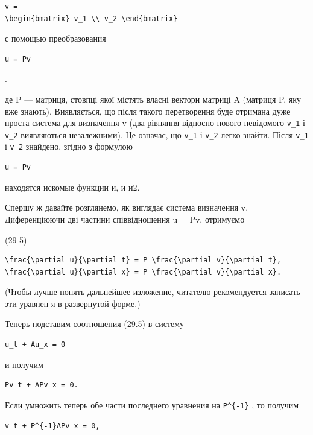 \documentclass[
  ukrainian,
]{article}
\begin{document}
\begin{verbatim}
v =
\begin{bmatrix} v_1 \\ v_2 \end{bmatrix}
\end{verbatim}

с помощью преобразования

\begin{verbatim}
u = Pv
\end{verbatim}

.

де P --- матриця, стовпці якої містять власні вектори матриці A (матриця
P, яку вже знають). Виявляється, що після такого перетворення буде
отримана дуже проста система для визначення v (два рівняння відносно
нового невідомого \texttt{v\_1} і \texttt{v\_2} виявляються
незалежними). Це означає, що \texttt{v\_1} і \texttt{v\_2} легко знайти.
Після \texttt{v\_1} і \texttt{v\_2} знайдено, згідно з формулою

\begin{verbatim}
u = Pv
\end{verbatim}

находятся искомые функции и, и и2.

Спершу ж давайте розглянемо, як виглядає система визначення v.
Диференціюючи дві частини співвідношення u = Pv, отримуємо

(29 5)

\begin{verbatim}
\frac{\partial u}{\partial t} = P \frac{\partial v}{\partial t},
\frac{\partial u}{\partial x} = P \frac{\partial v}{\partial x}.
\end{verbatim}

(Чтобы лучше понять дальнейшее изложение, читателю рекомендуется
записать эти уравнен я в развернутой форме.)

Теперь подставим соотношения (29.5) в систему

\begin{verbatim}
u_t + Au_x = 0
\end{verbatim}

и получим

\begin{verbatim}
Pv_t + APv_x = 0.
\end{verbatim}

Если умножить теперь обе части последнего уравнения на
\texttt{P\^{}\{-1\}} , то получим

\begin{verbatim}
v_t + P^{-1}APv_x = 0,
\end{verbatim}
\end{document}
